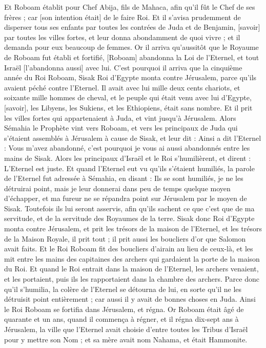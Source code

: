 \begin{multicols}{2}
Et Roboam établit pour Chef Abija, fils de Mahaca, afin qu'il fût le Chef de ses frères ; car [son intention était] de le faire Roi.
Et il s'avisa prudemment de disperser tous ses enfants par toutes les contrées de Juda et de Benjamin, [savoir] par toutes les villes fortes, et leur donna abondamment de quoi vivre ; et il demanda pour eux beaucoup de femmes.
\VerseOne{}Or il arriva qu'aussitôt que le Royaume de Roboam fut établi et fortifié, [Roboam] abandonna la Loi de l'Eternel, et tout Israël [l'abandonna aussi] avec lui.
C'est pourquoi il arriva que la cinquième année du Roi Roboam, Sisak Roi d'Egypte monta contre Jérusalem, parce qu'ils avaient péché contre l'Eternel.
Il avait avec lui mille deux cents chariots, et soixante mille hommes de cheval, et le peuple qui était venu avec lui d'Egypte, [savoir], les Libyens, les Sukiens, et les Ethiopiens, était sans nombre.
Et il prit les villes fortes qui appartenaient à Juda, et vint jusqu'à Jérusalem.
Alors Sémahia le Prophète vint vers Roboam, et vers les principaux de Juda qui s'étaient assemblés à Jérusalem à cause de Sisak, et leur dit : Ainsi a dit l'Eternel : Vous m'avez abandonné, c'est pourquoi je vous ai aussi abandonnés entre les mains de Sisak.
Alors les principaux d'Israël et le Roi s'humilièrent, et dirent : L'Eternel est juste.
Et quand l'Eternel eut vu qu'ils s'étaient humiliés, la parole de l'Eternel fut adressée à Sémahia, en disant : Ils se sont humiliés, je ne les détruirai point, mais je leur donnerai dans peu de temps quelque moyen d'échapper, et ma fureur ne se répandra point sur Jérusalem par le moyen de Sisak.
Toutefois ils lui seront asservis, afin qu'ils sachent ce que c'est que de ma servitude, et de la servitude des Royaumes de la terre.
Sisak donc Roi d'Egypte monta contre Jérusalem, et prit les trésors de la maison de l'Eternel, et les trésors de la Maison Royale, il prit tout ; il prit aussi les boucliers d'or que Salomon avait faits.
Et le Roi Roboam fit des boucliers d'airain au lieu de ceux-là, et les mit entre les mains des capitaines des archers qui gardaient la porte de la maison du Roi.
Et quand le Roi entrait dans la maison de l'Eternel, les archers venaient, et les portaient, puis ils les rapportaient dans la chambre des archers.
Parce donc qu'il s'humilia, la colère de l'Eternel se détourna de lui, en sorte qu'il ne les détruisit point entièrement ; car aussi il y avait de bonnes choses en Juda.
Ainsi le Roi Roboam se fortifia dans Jérusalem, et régna. Or Roboam était âgé de quarante et un ans, quand il commença à régner, et il régna dix-sept ans à Jérusalem, la ville que l'Eternel avait choisie d'entre toutes les Tribus d'Israël pour y mettre son Nom ; et sa mère avait nom Nahama, et était Hammonite.

\end{multicols}
